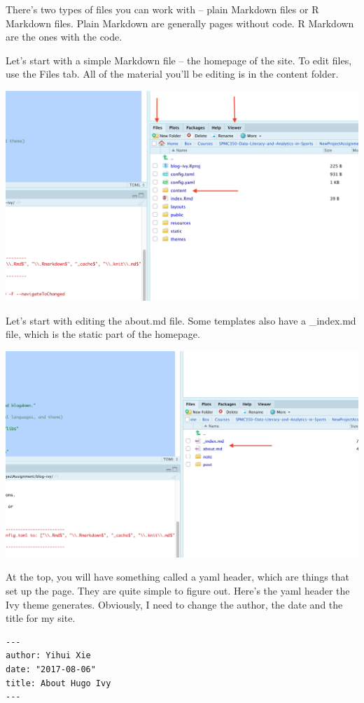 \documentclass[
]{book}
\begin{document}
There's two types of files you can work with -- plain Markdown files or R Markdown files. Plain Markdown are generally pages without code. R Markdown are the ones with the code.

Let's start with a simple Markdown file -- the homepage of the site. To edit files, use the Files tab. All of the material you'll be editing is in the content folder.

\includegraphics[width=27.69in]{images/blog4}

Let's start with editing the about.md file. Some templates also have a \_index.md file, which is the static part of the homepage.

\includegraphics[width=28.81in]{images/blog5}

At the top, you will have something called a yaml header, which are things that set up the page. They are quite simple to figure out. Here's the yaml header the Ivy theme generates. Obviously, I need to change the author, the date and the title for my site.

\begin{verbatim}
---
author: Yihui Xie
date: "2017-08-06"
title: About Hugo Ivy
---
\end{verbatim}
\end{document}
